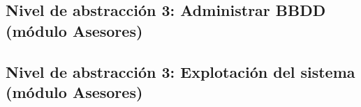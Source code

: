\subsection{Nivel de abstracción 3: Administrar BBDD (módulo Asesores)}



\subsection{Nivel de abstracción 3: Explotación del sistema (módulo Asesores)}

